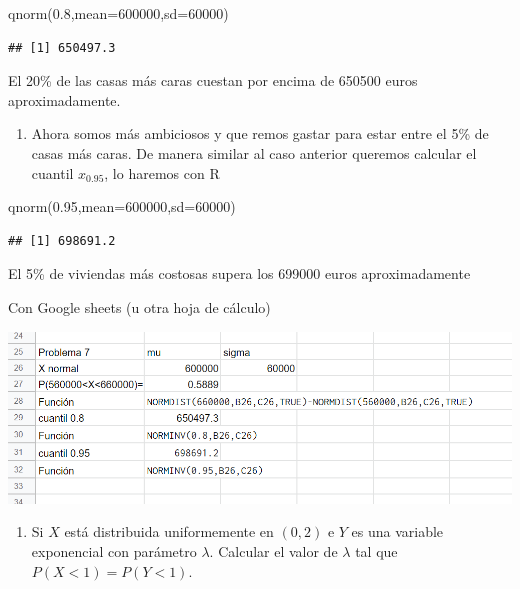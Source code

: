 \documentclass[
]{article}
\newenvironment{Shaded}{\begin{snugshade}}{\end{snugshade}}
\newcommand{\AttributeTok}[1]{\textcolor[rgb]{0.77,0.63,0.00}{#1}}
\newcommand{\DecValTok}[1]{\textcolor[rgb]{0.00,0.00,0.81}{#1}}
\newcommand{\FloatTok}[1]{\textcolor[rgb]{0.00,0.00,0.81}{#1}}
\newcommand{\FunctionTok}[1]{\textcolor[rgb]{0.00,0.00,0.00}{#1}}
\newcommand{\NormalTok}[1]{#1}
\providecommand{\tightlist}{%
  \setlength{\itemsep}{0pt}\setlength{\parskip}{0pt}}
\begin{document}
\begin{Shaded}
\begin{Highlighting}[]
\FunctionTok{qnorm}\NormalTok{(}\FloatTok{0.8}\NormalTok{,}\AttributeTok{mean=}\DecValTok{600000}\NormalTok{,}\AttributeTok{sd=}\DecValTok{60000}\NormalTok{)}
\end{Highlighting}
\end{Shaded}

\begin{verbatim}
## [1] 650497.3
\end{verbatim}

El 20\% de las casas más caras cuestan por encima de 650500 euros
aproximadamente.

\begin{enumerate}
\def\labelenumi{\alph{enumi}.}
\setcounter{enumi}{2}
\tightlist
\item
  Ahora somos más ambiciosos y que remos gastar para estar entre el 5\%
  de casas más caras. De manera similar al caso anterior queremos
  calcular el cuantil \(x_{0.95}\), lo haremos con R
\end{enumerate}

\begin{Shaded}
\begin{Highlighting}[]
\FunctionTok{qnorm}\NormalTok{(}\FloatTok{0.95}\NormalTok{,}\AttributeTok{mean=}\DecValTok{600000}\NormalTok{,}\AttributeTok{sd=}\DecValTok{60000}\NormalTok{)}
\end{Highlighting}
\end{Shaded}

\begin{verbatim}
## [1] 698691.2
\end{verbatim}

El 5\% de viviendas más costosas supera los 699000 euros aproximadamente

Con Google sheets (u otra hoja de cálculo)

\includegraphics[width=13.93in]{pro7_cont_1}

\newpage

\begin{enumerate}
\def\labelenumi{\arabic{enumi}.}
\setcounter{enumi}{6}
\tightlist
\item
  Si \(X\) está distribuida uniformemente en \((0,2)\) e \(Y\) es una
  variable exponencial con parámetro \(\lambda\). Calcular el valor de
  \(\lambda\) tal que \(P(X<1)=P(Y<1)\).
\end{enumerate}
\end{document}
